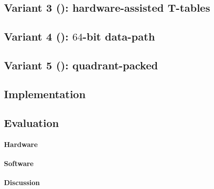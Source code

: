 \documentclass[preprint]{iacrtrans}
\begin{document}
\subsection{Variant 3 (): hardware-assisted T-tables}
\label{sec:ise:design:v3}

\subsection{Variant 4 (): $64$-bit data-path}
\label{sec:ise:design:v4}

\subsection{Variant 5 (): quadrant-packed}
\label{sec:ise:design:v5}





\subsection{Implementation}
\label{sec:ise:imp}



\subsection{Evaluation}

\paragraph{Hardware}
\label{sec:ise:eval:hw}


\paragraph{Software}
\label{sec:ise:eval:sw}


\paragraph{Discussion}
\label{sec:ise:eval:discuss}


\end{document}
